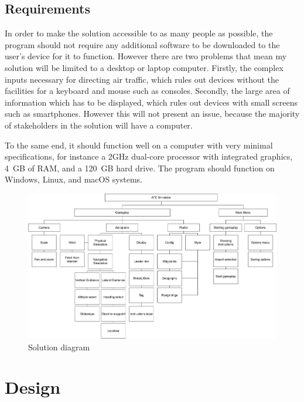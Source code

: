 \documentclass{article}
\begin{document}


\subsection{Requirements}
In order to make the solution accessible to as many people as possible, the program should not require any additional software to be downloaded to the user's device for it to function.
However there are two problems that mean my solution will be limited to a desktop or laptop computer.
Firstly, the complex inputs necessary for directing air traffic, which rules out devices without the facilities for a keyboard and mouse such as consoles.
Secondly, the large area of information which has to be displayed, which rules out devices with small screens such as smartphones.
However this will not present an issue, because the majority of stakeholders in the solution will have a computer.

To the same end, it should function well on a computer with very minimal specifications, for instance a 2GHz dual-core processor with integrated graphics, 4 GB of RAM, and a 120 GB hard drive.
The program should function on Windows, Linux, and macOS systems.
\clearpage

\begin{figure}
    \includegraphics[width=\textwidth]{diagrams/problemdiagram.png}
    \caption{\label{fig:solution_diagram}Solution diagram}
\end{figure}

\clearpage

\section{Design} \label{design}
\end{document}
